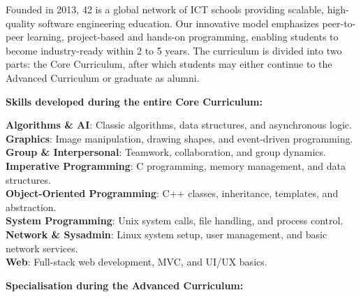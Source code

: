 \documentclass[11pt]{article}
\begin{document}
{{{{	

\vspace{0.5cm}

\fontsize{11}{13}\selectfont
\begin{flushleft}
	Founded in 2013, 42 is a global network of ICT schools providing scalable, high-quality software engineering education.
	Our innovative model emphasizes peer-to-peer learning, project-based and hands-on programming, enabling students to become industry-ready within 2 to 5 years.
	The curriculum is divided into two parts: the Core Curriculum, after which students may either continue to the Advanced Curriculum or graduate as alumni.
	
\end{flushleft}

\vspace{0.5em}

\noindent\textbf{Skills developed during the entire Core Curriculum:}
\vspace{1.0em}

\noindent \textbf{Algorithms \& AI}: Classic algorithms, data structures, and asynchronous logic.\\
\noindent \textbf{Graphics}: Image manipulation, drawing shapes, and event-driven programming.\\
\noindent \textbf{Group \& Interpersonal}: Teamwork, collaboration, and group dynamics.\\
\noindent \textbf{Imperative Programming}: C programming, memory management, and data structures.\\
\noindent \textbf{Object-Oriented Programming}: C++ classes, inheritance, templates, and abstraction.\\
\noindent \textbf{System Programming}: Unix system calls, file handling, and process control.\\
\noindent \textbf{Network \& Sysadmin}: Linux system setup, user management, and basic network services.\\
\noindent \textbf{Web}: Full-stack web development, MVC, and UI/UX basics.\\

\vspace{1.0cm}

{%
\noindent\textbf{Specialisation during the Advanced Curriculum:}
\vspace{0.5em}

}}}}}
\end{document}
